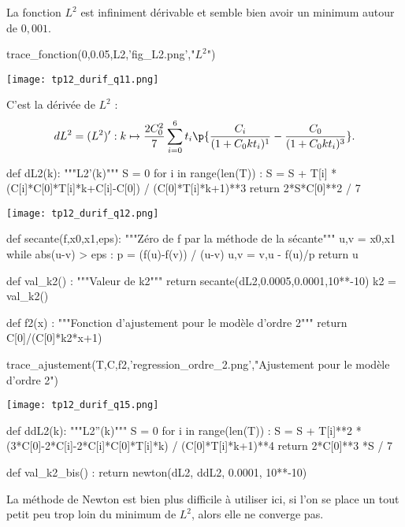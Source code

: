 \question{}
La fonction $L^2$ est infiniment dérivable et semble bien avoir un minimum autour de $0,001$.
\begin{pyverbatim}
trace_fonction(0,0.05,L2,'fig_L2.png',"$L^2$")
\end{pyverbatim}

\begin{center}
\texttt{[image: tp12\_durif\_q11.png]}
\end{center}

\question{}
C'est la dérivée de $L^2$ : 
\begin{equation*}
  dL^2 = (L^2)' : k \mapsto \dfrac{2C_0^2}{7} \sum_{i=0}^6 t_i \p{ \dfrac{C_i}{(1+C_0kt_i)^1} -\dfrac{C_0}{(1+C_0kt_i)^3}}.
\end{equation*}
\begin{pyverbatim}
def dL2(k):
    """L2'(k)"""
    S = 0
    for i in range(len(T)) :
        S = S + T[i] * (C[i]*C[0]*T[i]*k+C[i]-C[0]) / (C[0]*T[i]*k+1)**3
    return  2*S*C[0]**2 / 7 
\end{pyverbatim}

\begin{center}
\texttt{[image: tp12\_durif\_q12.png]}
\end{center}


\question{}
\begin{pyverbatim}
def secante(f,x0,x1,eps):
    """Zéro de f par la méthode de la sécante"""
    u,v = x0,x1
    while abs(u-v) > eps : 
        p = (f(u)-f(v)) / (u-v)
        u,v = v,u - f(u)/p
    return u
\end{pyverbatim}

\question{}
\begin{pyverbatim}
def val_k2() :
    """Valeur de k2"""
    return secante(dL2,0.0005,0.0001,10**-10)
k2 = val_k2()  
\end{pyverbatim}

\question{}
\begin{pyverbatim}
def f2(x) :
    """Fonction d'ajustement pour le modèle d'ordre 2"""
    return  C[0]/(C[0]*k2*x+1)

trace_ajustement(T,C,f2,'regression_ordre_2.png',"Ajustement pour le modèle d'ordre 2")  
\end{pyverbatim}

\begin{center}
\texttt{[image: tp12\_durif\_q15.png]}
\end{center}

\question{}
\begin{pyverbatim}
def ddL2(k):
    """L2''(k)"""
    S = 0
    for i in range(len(T)) :
        S = S + T[i]**2 * (3*C[0]-2*C[i]-2*C[i]*C[0]*T[i]*k) / (C[0]*T[i]*k+1)**4
    return  2*C[0]**3 *S / 7

def val_k2_bis() :
    return newton(dL2, ddL2, 0.0001, 10**-10)
\end{pyverbatim}
La méthode de Newton est bien plus difficile à utiliser ici, si l'on se place un tout petit peu trop loin du minimum de $L^2$, alors elle ne converge pas.

